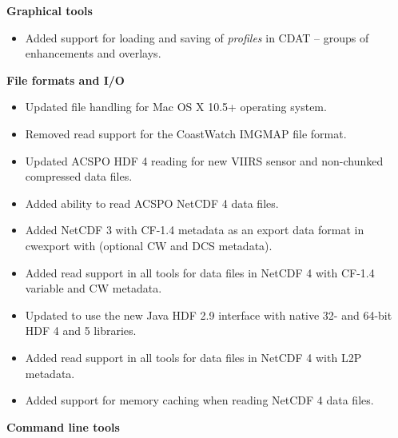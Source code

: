 \hspace{0.4cm} {\bf Graphical tools}

\begin{itemize}

  \item Added support for loading and saving of {\em profiles} in CDAT -- 
  groups of enhancements and overlays.


\end{itemize}

\hspace{0.4cm} {\bf File formats and I/O}

\begin{itemize}

  \item Updated file handling for Mac OS X 10.5+ operating system.

  \item Removed read support for the CoastWatch IMGMAP file format.

  \item Updated ACSPO HDF 4 reading for new VIIRS sensor and non-chunked 
  compressed data files.

  \item Added ability to read ACSPO NetCDF 4 data files.

  \item Added NetCDF 3 with CF-1.4 metadata as an export data format in 
  cwexport with (optional CW and DCS metadata).

  \item Added read support in all tools for data files in NetCDF 4 with CF-1.4 
  variable and CW metadata.

  \item Updated to use the new Java HDF 2.9 interface with native 32- and 
  64-bit HDF 4 and 5 libraries.
  
  \item Added read support in all tools for data files in NetCDF 4 with L2P
  metadata.

  \item Added support for memory caching when reading NetCDF 4 data files.

\end{itemize}

\hspace{0.4cm} {\bf Command line tools}

